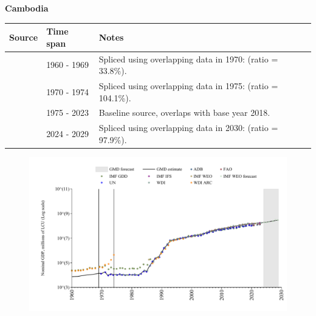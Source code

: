 \documentclass[12pt,a4paper,landscape]{article}
\begin{document}
\begin{adjustbox}{max totalsize={\paperwidth}{\paperheight},center}
\begin{minipage}[t][\textheight][t]{\textwidth}
\vspace*{0.5cm}
{}
\begin{center}
{\Large\bfseries Cambodia}
\end{center}
\vspace{0.5cm}
\begin{table}[H]
\centering
\small
\begin{tabular}{|l|l|l|}
\hline
\textbf{Source} & \textbf{Time span} & \textbf{Notes} \\
\hline
\rowcolor{white}\cite{WDI_ARC}& 1960 - 1969 &Spliced using overlapping data in 1970: (ratio = 33.8\%).\\
\rowcolor{lightgray}\cite{UN}& 1970 - 1974 &Spliced using overlapping data in 1975: (ratio = 104.1\%).\\
\rowcolor{white}\cite{WDI}& 1975 - 2023 &Baseline source, overlaps with base year 2018.\\
\rowcolor{lightgray}\cite{IMF_WEO_forecast}& 2024 - 2029 &Spliced using overlapping data in 2030: (ratio = 97.9\%).\\
\hline
\end{tabular}
\end{table}
\begin{figure}[H]
\centering
\includegraphics[width=\textwidth,height=0.6\textheight,keepaspectratio]{graphs/KHM_nGDP.pdf}
\end{figure}
\end{minipage}
\end{adjustbox}
\end{document}
